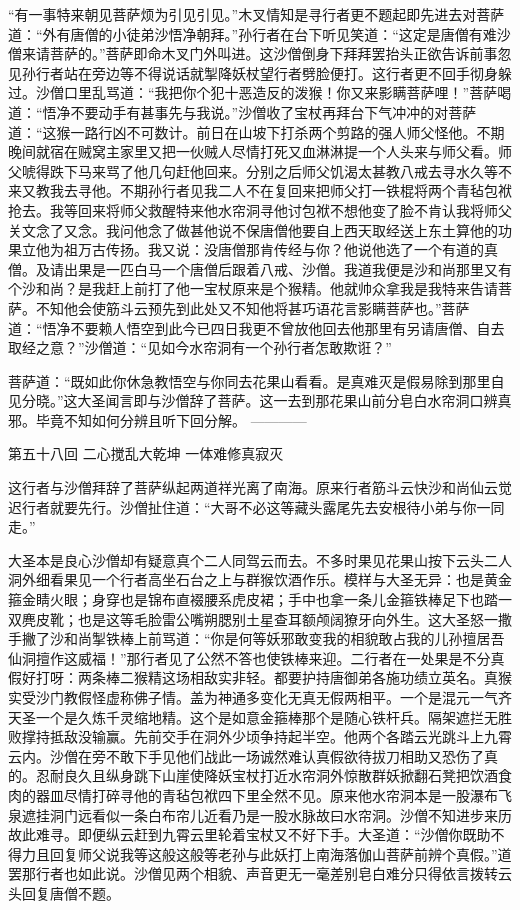 \documentclass[12pt,UTF8]{ctexbook}
\begin{document}
“有一事特来朝见菩萨烦为引见引见。”木叉情知是寻行者更不题起即先进去对菩萨道：“外有唐僧的小徒弟沙悟净朝拜。”孙行者在台下听见笑道：“这定是唐僧有难沙僧来请菩萨的。”菩萨即命木叉门外叫进。这沙僧倒身下拜拜罢抬头正欲告诉前事忽见孙行者站在旁边等不得说话就掣降妖杖望行者劈脸便打。这行者更不回手彻身躲过。沙僧口里乱骂道：“我把你个犯十恶造反的泼猴！你又来影瞒菩萨哩！”菩萨喝道：“悟净不要动手有甚事先与我说。”沙僧收了宝杖再拜台下气冲冲的对菩萨道：“这猴一路行凶不可数计。前日在山坡下打杀两个剪路的强人师父怪他。不期晚间就宿在贼窝主家里又把一伙贼人尽情打死又血淋淋提一个人头来与师父看。师父唬得跌下马来骂了他几句赶他回来。分别之后师父饥渴太甚教八戒去寻水久等不来又教我去寻他。不期孙行者见我二人不在复回来把师父打一铁棍将两个青毡包袱抢去。我等回来将师父救醒特来他水帘洞寻他讨包袱不想他变了脸不肯认我将师父关文念了又念。我问他念了做甚他说不保唐僧他要自上西天取经送上东土算他的功果立他为祖万古传扬。我又说：没唐僧那肯传经与你？他说他选了一个有道的真僧。及请出果是一匹白马一个唐僧后跟着八戒、沙僧。我道我便是沙和尚那里又有个沙和尚？是我赶上前打了他一宝杖原来是个猴精。他就帅众拿我是我特来告请菩萨。不知他会使筋斗云预先到此处又不知他将甚巧语花言影瞒菩萨也。”菩萨道：“悟净不要赖人悟空到此今已四日我更不曾放他回去他那里有另请唐僧、自去取经之意？”沙僧道：“见如今水帘洞有一个孙行者怎敢欺诳？”

菩萨道：“既如此你休急教悟空与你同去花果山看看。是真难灭是假易除到那里自见分晓。”这大圣闻言即与沙僧辞了菩萨。这一去到那花果山前分皂白水帘洞口辨真邪。毕竟不知如何分辨且听下回分解。
------------

第五十八回 二心搅乱大乾坤 一体难修真寂灭

这行者与沙僧拜辞了菩萨纵起两道祥光离了南海。原来行者筋斗云快沙和尚仙云觉迟行者就要先行。沙僧扯住道：“大哥不必这等藏头露尾先去安根待小弟与你一同走。”

大圣本是良心沙僧却有疑意真个二人同驾云而去。不多时果见花果山按下云头二人洞外细看果见一个行者高坐石台之上与群猴饮酒作乐。模样与大圣无异：也是黄金箍金睛火眼；身穿也是锦布直裰腰系虎皮裙；手中也拿一条儿金箍铁棒足下也踏一双麂皮靴；也是这等毛脸雷公嘴朔腮别土星查耳额颅阔獠牙向外生。这大圣怒一撒手撇了沙和尚掣铁棒上前骂道：“你是何等妖邪敢变我的相貌敢占我的儿孙擅居吾仙洞擅作这威福！”那行者见了公然不答也使铁棒来迎。二行者在一处果是不分真假好打呀：两条棒二猴精这场相敌实非轻。都要护持唐御弟各施功绩立英名。真猴实受沙门教假怪虚称佛子情。盖为神通多变化无真无假两相平。一个是混元一气齐天圣一个是久炼千灵缩地精。这个是如意金箍棒那个是随心铁杆兵。隔架遮拦无胜败撑持抵敌没输赢。先前交手在洞外少顷争持起半空。他两个各踏云光跳斗上九霄云内。沙僧在旁不敢下手见他们战此一场诚然难认真假欲待拔刀相助又恐伤了真的。忍耐良久且纵身跳下山崖使降妖宝杖打近水帘洞外惊散群妖掀翻石凳把饮酒食肉的器皿尽情打碎寻他的青毡包袱四下里全然不见。原来他水帘洞本是一股瀑布飞泉遮挂洞门远看似一条白布帘儿近看乃是一股水脉故曰水帘洞。沙僧不知进步来历故此难寻。即便纵云赶到九霄云里轮着宝杖又不好下手。大圣道：“沙僧你既助不得力且回复师父说我等这般这般等老孙与此妖打上南海落伽山菩萨前辨个真假。”道罢那行者也如此说。沙僧见两个相貌、声音更无一毫差别皂白难分只得依言拨转云头回复唐僧不题。
\end{document}

